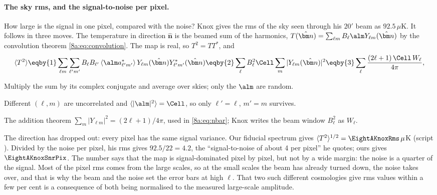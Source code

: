 \paragraph{The sky rms, and the signal-to-noise per pixel.}
How large is the signal in one pixel, compared with the noise? Knox gives the rms of the sky seen
through his $20'$ beam as $92.5\,\mu$K. It follows in three moves. The temperature in direction
$\hat{\bm n}$ is the beamed sum of the harmonics, $T(\hat{\bm n})=\sum_{\ell m}B_\ell\alm Y_{\ell m}(\hat{\bm n})$
by the convolution theorem \eqref{8a:eq:convolution}. The map is real, so $T^2=TT^*$, and
\begin{equation}
  \langle T^2\rangle
  \eqby{1}\sum_{\ell m}\sum_{\ell'm'}B_\ell B_{\ell'}\,\langle\alm a^*_{\ell'm'}\rangle\,
     Y_{\ell m}(\hat{\bm n})Y^*_{\ell'm'}(\hat{\bm n})
  \eqby{2}\sum_\ell B_\ell^2\Cell\sum_m|Y_{\ell m}(\hat{\bm n})|^2
  \eqby{3}\sum_\ell\frac{(2\ell+1)\,\Cell\,W_\ell}{4\pi},
  \nonumber
\end{equation}
\begin{explain}
  \item Multiply the sum by its complex conjugate and average over skies; only the $\alm$ are random.
  \item Different $(\ell,m)$ are uncorrelated and $\langle|\alm|^2\rangle=\Cell$, so only $\ell'=\ell$,
        $m'=m$ survives.
  \item The addition theorem $\sum_m|Y_{\ell m}|^2=(2\ell+1)/4\pi$, used in \eqref{8a:eq:nbar}; Knox
        writes the beam window $B_\ell^2$ as $W_\ell$.
\end{explain}
The direction has dropped out: every pixel has the same signal variance. Our fiducial spectrum
gives $\langle T^2\rangle^{1/2}=\EightAKnoxRms\,\mu$K (script ). Divided
by the noise per pixel, his rms gives $92.5/22=4.2$, the ``signal-to-noise of about 4 per pixel''
he quotes; ours gives $\EightAKnoxSnrPix$. The number says that the map is signal-dominated pixel by
pixel, but not by a wide margin: the noise is a quarter of the signal. Most of the pixel rms comes
from the large scales, so at the small scales the beam has already turned down, the noise takes
over, and that is why the beam and the noise set the error bars at high $\ell$. That two such
different cosmologies give rms values within a few per cent is a consequence of both being
normalised to the measured large-scale amplitude.


